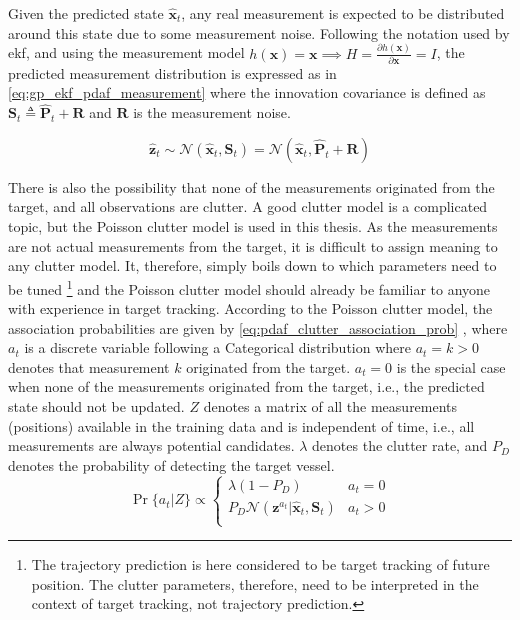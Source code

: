Given the predicted state $\hat{\boldsymbol{x}}_t$, any real measurement is expected to be distributed around this state due to some measurement noise. Following the notation used by \acrshort{ekf}, and using the measurement model $h(\boldsymbol{x}) = \boldsymbol{x} \implies H = \frac{\partial h (\boldsymbol{x})}{\partial \boldsymbol{x}} = I$, the predicted measurement distribution is expressed as in \cref{eq:gp_ekf_pdaf_measurement} where the innovation covariance is defined as $\boldsymbol{S}_t \triangleq \hat{\boldsymbol{P}}_t + \boldsymbol{R}$ and $\boldsymbol{R}$ is the measurement noise.

\begin{equation} \label{eq:gp_ekf_pdaf_measurement}
    \hat{\boldsymbol{z}}_t \sim \mathcal{N}(\hat{\boldsymbol{x}}_t, \boldsymbol{S}_{t}) = \mathcal{N}(\hat{\boldsymbol{x}}_t, \hat{\boldsymbol{P}}_t + \boldsymbol{R})
\end{equation}

There is also the possibility that none of the measurements originated from the target, and all observations are clutter. A good clutter model is a complicated topic, but the Poisson clutter model is used in this thesis. As the measurements are not actual measurements from the target, it is difficult to assign meaning to any clutter model. It, therefore, simply boils down to which parameters need to be tuned \footnote{The trajectory prediction is here considered to be target tracking of future position. The clutter parameters, therefore, need to be interpreted in the context of target tracking, not trajectory prediction.} and the Poisson clutter model should already be familiar to anyone with experience in target tracking.
According to the Poisson clutter model, the association probabilities are given by \cref{eq:pdaf_clutter_association_prob} \cite{sensorfusjon}, where $a_t$ is a discrete variable following a Categorical distribution where $a_t=k > 0$ denotes that measurement $k$ originated from the target. $a_t = 0$ is the special case when none of the measurements originated from the target, i.e., the predicted state should not be updated. $Z$ denotes a matrix of all the measurements (positions) available in the training data and is independent of time, i.e., all measurements are always potential candidates. $\lambda$ denotes the clutter rate, and $P_D$ denotes the probability of detecting the target vessel.
\begin{equation}\label{eq:pdaf_clutter_association_prob}
    \Pr\{a_t | Z\} \propto \begin{cases}
        \lambda (1 - P_D)                                                                 & a_t = 0 \\
        P_D \mathcal{N} (\boldsymbol{z}^{a_t} | \hat{\boldsymbol{x}}_t, \boldsymbol{S}_t) & a_t > 0 \\
    \end{cases}
\end{equation}

